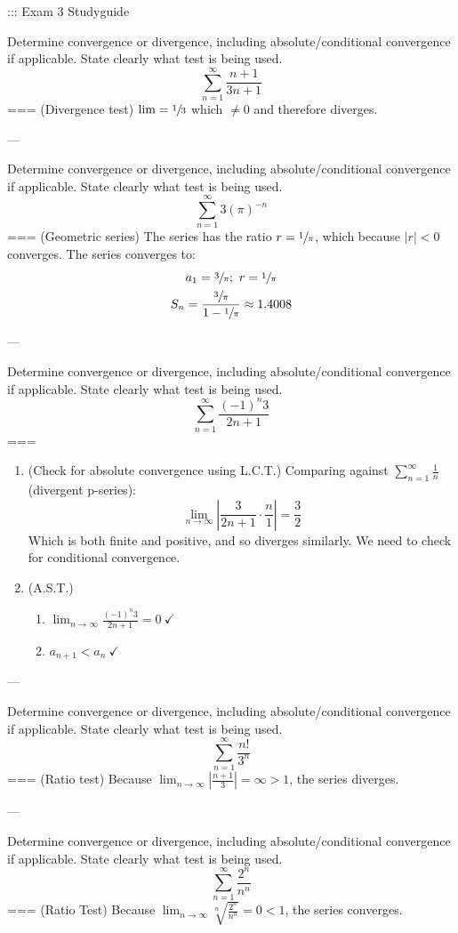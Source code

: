 ::: Exam 3 Studyguide

Determine convergence or divergence, including absolute/conditional convergence
if applicable. State clearly what test is being used.
\[\sum_{n=1}^\infty \frac{n+1}{3n+1}\]
===
(Divergence test) \(\lim=\sfrac{1}{3}\) which \(\neq 0\) and therefore diverges.

---

Determine convergence or divergence, including absolute/conditional convergence
if applicable. State clearly what test is being used.
\[\sum_{n=1}^\infty 3{(\pi)}^{-n}\]
===
(Geometric series)
The series has the ratio \(r=\sfrac{1}{\pi}\), which because \(|r|<0\)
converges. The series converges to:
\begin{gather*}
a_1=\sfrac{3}{\pi};\ r=\sfrac{1}{\pi}\\
S_n=\frac{\sfrac{3}{\pi}}{1-\sfrac{1}{\pi}}\approx 1.4008
\end{gather*}

---

Determine convergence or divergence, including absolute/conditional convergence
if applicable. State clearly what test is being used.
\[\sum_{n=1}^\infty \frac{{(-1)}^n 3}{2n+1}\]
===
\begin{enumerate}
  \item (Check for absolute convergence using L.C.T.) Comparing against
    \(\sum_{n=1}^\infty \frac{1}{n}\) (divergent p-series):
    \[\lim_{n\to\infty}\left|\frac{3}{2n+1}\cdot\frac{n}{1}\right|=\frac{3}{2}\]
    Which is both finite and positive, and so diverges similarly. We need to
    check for conditional convergence.
  \item (A.S.T.)
    \begin{enumerate}
      \item \(\displaystyle \lim_{n\to\infty}\frac{{(-1)}^n
        3}{2n+1}=0\ \checkmark\)
      \item \(a_{n+1}<a_n\ \checkmark\)
    \end{enumerate}
\end{enumerate}

---

Determine convergence or divergence, including absolute/conditional convergence
if applicable. State clearly what test is being used.
\[\sum_{n=1}^\infty \frac{n!}{3^n}\]
===
(Ratio test) Because \(\lim_{n\to\infty}\left|\frac{n+1}{3}\right|=\infty>1\),
the series diverges.

---

Determine convergence or divergence, including absolute/conditional convergence
if applicable. State clearly what test is being used.
\[\sum_{n=1}^\infty \frac{2^n}{n^n}\]
===
(Ratio Test) Because \(\lim_{n\to\infty}\sqrt[n]{\frac{2^n}{n^n}}=0<1\), the
series converges.


